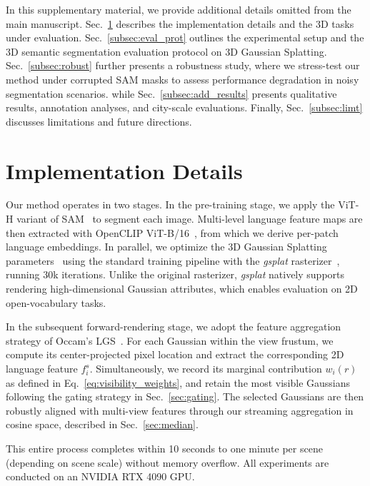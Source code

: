 \clearpage
\setcounter{page}{1}
\maketitlesupplementary
\appendix

In this supplementary material, we provide additional details omitted from the main manuscript. Sec.~\ref{subsec:impl} describes the implementation details and the 3D tasks under evaluation. Sec.~\ref {subsec:eval_prot} outlines the experimental setup and the 3D semantic segmentation evaluation protocol on 3D Gaussian Splatting. Sec.~\ref{subsec:robust} further presents a robustness study, where we stress-test our method under corrupted SAM masks to assess performance degradation in noisy segmentation scenarios.  while Sec.~\ref{subsec:add_results} presents qualitative results, annotation analyses, and city-scale evaluations. Finally, Sec.~\ref{subsec:limt} discusses limitations and future directions. 

\section{Implementation Details}
\label{subsec:impl}

Our method operates in two stages. In the pre-training stage, we apply the ViT-H variant of SAM~\cite{kirillov2023sam} to segment each image. Multi-level language feature maps are then extracted with OpenCLIP ViT-B/16~\cite{radford2021clip}, from which we derive per-patch language embeddings. In parallel, we optimize the 3D Gaussian Splatting parameters~\cite{kerbl20233d} using the standard training pipeline with the \emph{gsplat} rasterizer~\cite{ye2025gsplat}, running 30k iterations. Unlike the original rasterizer, \emph{gsplat} natively supports rendering high-dimensional Gaussian attributes, which enables evaluation on 2D open-vocabulary tasks.

In the subsequent forward-rendering stage, we adopt the feature aggregation strategy of Occam’s LGS~\cite{cheng2024occam}. For each Gaussian within the view frustum, we compute its center-projected pixel location and extract the corresponding 2D language feature $f_i^s$. Simultaneously, we record its marginal contribution $w_i(r)$ as defined in Eq.~\eqref{eq:visibility_weights}, and retain the most visible Gaussians following the gating strategy in Sec.~\ref{sec:gating}. The selected Gaussians are then robustly aligned with multi-view features through our streaming aggregation in cosine space, described in Sec.~\ref{sec:median}.

This entire process completes within 10 seconds to one minute per scene (depending on scene scale) without memory overflow. All experiments are conducted on an NVIDIA RTX 4090 GPU.

